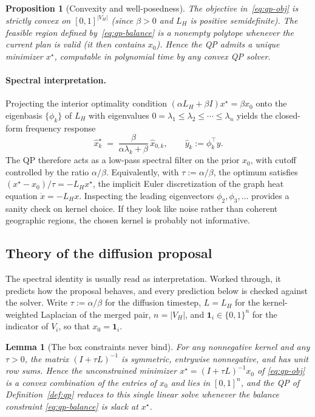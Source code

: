 \documentclass[11pt]{article}
\newtheorem{lemma}{Lemma}[section]
\newtheorem{proposition}{Proposition}[section]
\begin{document}
\begin{proposition}[Convexity and well-posedness]\label{prop:convex}
The objective in~\eqref{eq:qp-obj} is strictly convex on
$[0,1]^{|V_H|}$ (since $\beta > 0$ and $L_H$ is positive semidefinite).
The feasible region defined by~\eqref{eq:qp-balance} is a nonempty
polytope whenever the current plan is valid (it then contains $x_0$).
Hence the QP admits a unique minimizer $x^\star$, computable in
polynomial time by any convex QP solver.
\end{proposition}

\paragraph{Spectral interpretation.} Projecting the interior optimality
condition $(\alpha L_H + \beta I) x^\star = \beta x_0$ onto the
eigenbasis $\{\phi_k\}$ of $L_H$ with eigenvalues
$0 = \lambda_1 \le \lambda_2 \le \cdots \le \lambda_n$ yields the
closed-form frequency response
\begin{equation}\label{eq:freq-response}
  \hat x^\star_k \;=\; \frac{\beta}{\alpha \lambda_k + \beta}\,
  \hat x_{0,k},
  \qquad \hat y_k := \phi_k^\top y.
\end{equation}
The QP therefore acts as a low-pass spectral filter on the prior $x_0$,
with cutoff controlled by the ratio $\alpha / \beta$. Equivalently, with
$\tau := \alpha / \beta$, the optimum satisfies
$(x^\star - x_0)/\tau = -L_H x^\star$, the implicit Euler
discretization of the graph heat equation $\dot x = -L_H x$. Inspecting
the leading eigenvectors $\phi_2, \phi_3, \ldots$ provides a sanity
check on kernel choice. If they look like noise rather than coherent
geographic regions, the chosen kernel is probably not informative.

\subsection{Theory of the diffusion proposal}\label{sec:diffusion-theory}

The spectral identity is usually read as interpretation. Worked
through, it predicts how the proposal behaves, and every prediction
below is checked against the solver. Write $\tau := \alpha/\beta$ for
the diffusion timestep, $L = L_H$ for the kernel-weighted Laplacian of
the merged pair, $n = |V_H|$, and $\mathbf{1}_i \in \{0,1\}^{n}$ for
the indicator of $V_i$, so that $x_0 = \mathbf{1}_i$.

\begin{lemma}[The box constraints never bind]\label{lem:row-stochastic}
For any nonnegative kernel and any $\tau > 0$, the matrix
$(I + \tau L)^{-1}$ is symmetric, entrywise nonnegative, and has unit
row sums. Hence the unconstrained minimizer
$x^\star = (I + \tau L)^{-1} x_0$ of \eqref{eq:qp-obj} is a convex
combination of the entries of $x_0$ and lies in $[0,1]^{n}$, and the
QP of Definition~\ref{def:qp} reduces to this single linear solve
whenever the balance constraint \eqref{eq:qp-balance} is slack at
$x^\star$.
\end{lemma}
\end{document}
